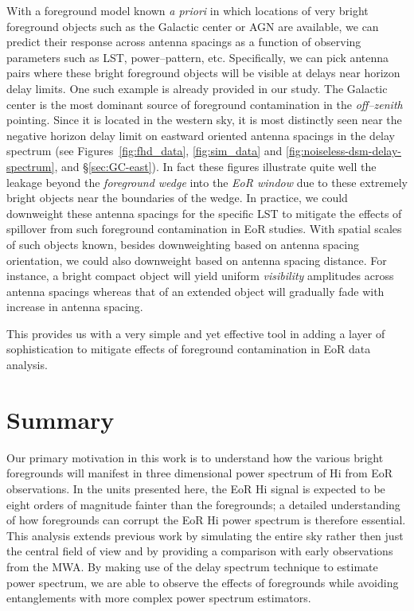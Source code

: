 \documentclass[preprint2,iop,numberedappendix]{emulateapj}
\begin{document}
With a foreground model known {\it a priori} in which locations of very bright foreground objects such as the Galactic center or AGN are available, we can predict their response across antenna spacings as a function of observing parameters such as LST, power--pattern, etc. Specifically, we can pick antenna pairs where these bright foreground objects will be visible at delays near horizon delay limits. One such example is already provided in our study. The Galactic center is the most dominant source of foreground contamination in the {\it off--zenith} pointing. Since it is located in the western sky, it is most distinctly seen near the negative horizon delay limit on eastward oriented antenna spacings in the delay spectrum (see Figures~\ref{fig:fhd_data}, \ref{fig:sim_data} and \ref{fig:noiseless-dsm-delay-spectrum}, and \S\ref{sec:GC-east}). In fact these figures illustrate quite well the leakage beyond the {\it foreground wedge} into the {\it EoR window} due to these extremely bright objects near the boundaries of the wedge. In practice, we could downweight these antenna spacings for the specific LST to mitigate the effects of spillover from such foreground contamination in EoR studies. With spatial scales of such objects known, besides downweighting based on antenna spacing orientation, we could also downweight based on antenna spacing distance. For instance, a bright compact object will yield uniform {\it visibility} amplitudes across antenna spacings whereas that of an extended object will gradually fade with increase in antenna spacing. 

This provides us with a very simple and yet effective tool in adding a layer of sophistication to mitigate effects of foreground contamination in EoR data analysis. %

\section{Summary}\label{sec:summary}

Our primary motivation in this work is to understand how the various bright foregrounds will manifest in three dimensional power spectrum of H{\sc i} from EoR observations. In the units presented here, the EoR H{\sc i} signal is expected to be eight orders of magnitude fainter than the foregrounds; a detailed understanding of how foregrounds can corrupt the EoR H{\sc i} power spectrum is therefore essential. This analysis extends previous work by simulating the entire sky rather then just the central field of view and by providing a comparison with early observations from the MWA. By making use of the delay spectrum technique to estimate power spectrum, we are able to observe the effects of foregrounds while avoiding entanglements with more complex power spectrum estimators.  
\end{document}
